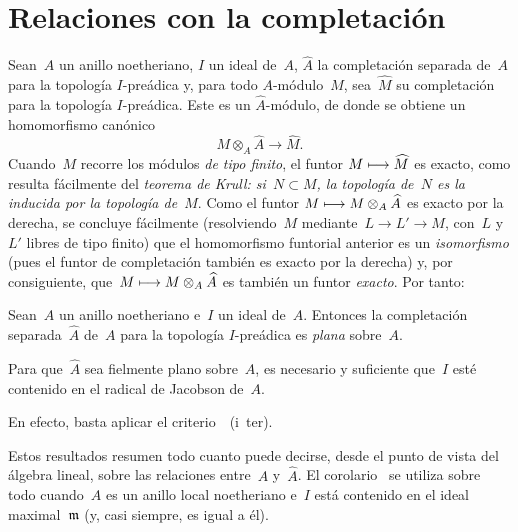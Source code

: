 
\section{Relaciones con la completación}
\label{IV.3}

Sean~$A$ un anillo noetheriano, $I$ un ideal de~$A$,
$\widehat{A}$ la completación separada de~$A$ para la topología
$I$-preádica y, para todo $A$-módulo~$M$, sea~$\widehat{M}$ su
completación para la topología $I$-preádica. Este es un
$\widehat{A}$-módulo, de donde se obtiene un homomorfismo canónico
$$
M\otimes_A\widehat{A}\to\widehat{M}.
$$
Cuando~$M$ recorre los módulos \emph{de tipo finito}, el funtor
$M\longmapsto\widehat{M}$ es exacto, como resulta fácilmente del
\emph{teorema de Krull: si~$N\subset M$, la topología de~$N$ es la
inducida por la topología de~$M$}. Como el funtor
$M\longmapsto M\otimes_A\widehat{A}$ es exacto por la derecha, se concluye
fácilmente (resolviendo~$M$ mediante~$L\to L'\to M$, con~$L$ y~$L'$
libres de tipo finito) que el homomorfismo funtorial anterior es un
\emph{isomorfismo} (pues el funtor de completación también es exacto por
la derecha) y, por consiguiente, que~$M\longmapsto M\otimes_A\widehat{A}$ es
también un funtor \emph{exacto}. Por tanto:

\begin{proposition}
\label{IV.3.1}
Sean~$A$ un anillo noetheriano e~$I$ un ideal de~$A$. Entonces la
completación separada~$\widehat{A}$ de~$A$ para la topología
$I$-preádica es \emph{plana} sobre~$A$.
\end{proposition}

\begin{corollaire}
\label{IV.3.2}
Para que~$\widehat{A}$ sea fielmente plano sobre~$A$, es necesario y
suficiente que~$I$ esté contenido en el radical de Jacobson de~$A$.
\end{corollaire}

En efecto, basta aplicar el criterio~~(i~ter).

Estos resultados resumen todo cuanto puede decirse, desde el punto de vista
del álgebra lineal, sobre las relaciones entre~$A$ y~$\widehat{A}$. El
corolario~ se utiliza sobre todo cuando~$A$ es un anillo local
noetheriano e~$I$ está contenido en el ideal maximal~$\mathfrak{m}$ (y, casi
siempre, es igual a él).

